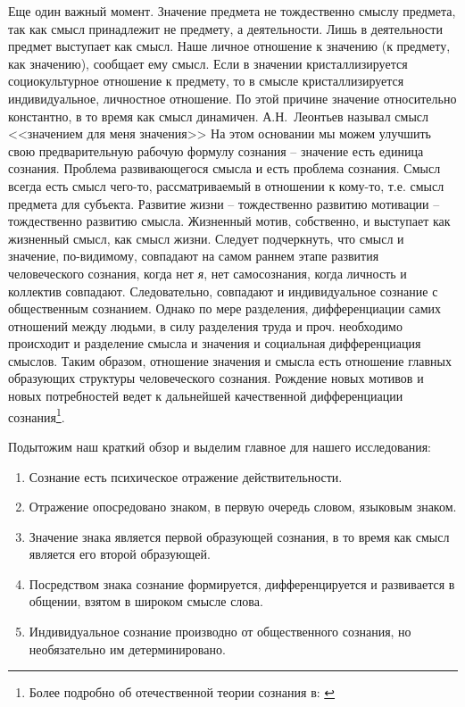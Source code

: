 Еще один важный момент. Значение предмета не тождественно смыслу предмета,
так как смысл принадлежит не предмету, а деятельности\autocite{leontev2005lectures}.
Лишь в деятельности предмет выступает как смысл.
Наше личное отношение к значению (к предмету, как значению), сообщает ему смысл.
Если в значении кристаллизируется социокультурное отношение к предмету,
то в смысле кристаллизируется индивидуальное, личностное отношение.
По этой причине значение относительно константно, в то время как смысл динамичен.
А.Н.~Леонтьев называл смысл <<значением для меня значения>>\autocite{leontev2005lectures}
На этом основании мы можем улучшить свою предварительную рабочую формулу сознания --
значение есть единица сознания. Проблема развивающегося смысла и есть проблема
сознания. Смысл всегда есть смысл чего-то, рассматриваемый в отношении к кому-то,
т.е. смысл предмета для субъекта. Развитие жизни -- тождественно развитию мотивации --
тождественно развитию смысла. Жизненный мотив, собственно, и выступает как жизненный
смысл, как смысл жизни. Следует подчеркнуть, что смысл и значение, по-видимому,
совпадают на самом раннем этапе развития человеческого сознания, когда нет \emph{я},
нет самосознания, когда личность и коллектив совпадают. Следовательно, совпадают и
индивидуальное сознание с общественным сознанием. Однако по мере разделения,
дифференциации самих отношений между людьми, в силу разделения труда и проч.
необходимо происходит и разделение смысла и значения и социальная дифференциация
смыслов. Таким образом, отношение значения и смысла есть отношение главных
образующих структуры человеческого сознания. Рождение новых мотивов и новых
потребностей ведет к дальнейшей качественной дифференциации сознания\footnote{Более подробно об отечественной теории сознания в: \autocites{leontevan1967}{leontevan1975}{leontevan1983}{vigotski1982}{leontevaa2001}}.


Подытожим наш краткий обзор и выделим главное для нашего исследования:
\begin{enumerate}
\item Сознание есть психическое отражение действительности.
\item Отражение опосредовано знаком, в первую очередь словом, языковым знаком.
\item Значение знака является первой образующей сознания, в то время как смысл
  является его второй образующей.
\item Посредством знака сознание формируется, дифференцируется и развивается
  в общении, взятом в широком смысле слова.
\item Индивидуальное сознание производно от общественного сознания,
  но необязательно им детерминировано.
\end{enumerate}

